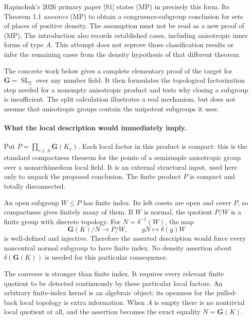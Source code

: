 \documentclass[11pt]{article}
\begin{document}
Rapinchuk's 2026 primary paper [S1] states (MP) in precisely this form.
Its Theorem 1.1 \emph{assumes} (MP) to obtain a congruence-subgroup
conclusion for sets of places of positive density. The assumption must
not be read as a new proof of (MP). The introduction also records
established cases, including anisotropic inner forms of type $A$.
This attempt does not reprove those classification results or infer the
remaining cases from the density hypothesis of that different theorem.

The concrete work below gives a complete elementary proof of the target
for $\mathbf G=\operatorname{SL}_2$ over any number field. It then
formulates the topological factorization step needed for a nonempty
anisotropic product and tests why closing a subgroup is insufficient.
The split calculation illustrates a real mechanism, but does not assume
that anisotropic groups contain the unipotent subgroups it uses.

\paragraph{What the local description would immediately imply.}
Put $P=\prod_{v\in A}\mathbf G(K_v)$. Each local factor in this
product is compact: this is the standard compactness theorem for the
points of a semisimple anisotropic group over a nonarchimedean local
field. It is an external structural input, used here only to unpack
the proposed conclusion. The finite product $P$ is compact and totally
disconnected.

An open subgroup $W\le P$ has finite index. Its left cosets are open
and cover $P$, so compactness gives finitely many of them. If $W$ is
normal, the quotient $P/W$ is a finite group with discrete topology.
For $N=\delta^{-1}(W)$, the map
\[
 \mathbf G(K)/N\longrightarrow P/W,
 \qquad gN\longmapsto\delta(g)W
 \tag{394.1}
\]
is well-defined and injective. Therefore the asserted description
would force every noncentral normal subgroup to have finite index.
No density assertion about $\delta(\mathbf G(K))$ is needed for this
particular consequence.

The converse is stronger than finite index. It requires every relevant
finite quotient to be detected continuously by these particular local
factors. An arbitrary finite-index kernel is an algebraic object; its
openness for the pulled-back local topology is extra information.
When $A$ is empty there is no nontrivial local quotient at all, and
the assertion becomes the exact equality $N=\mathbf G(K)$.
\end{document}
